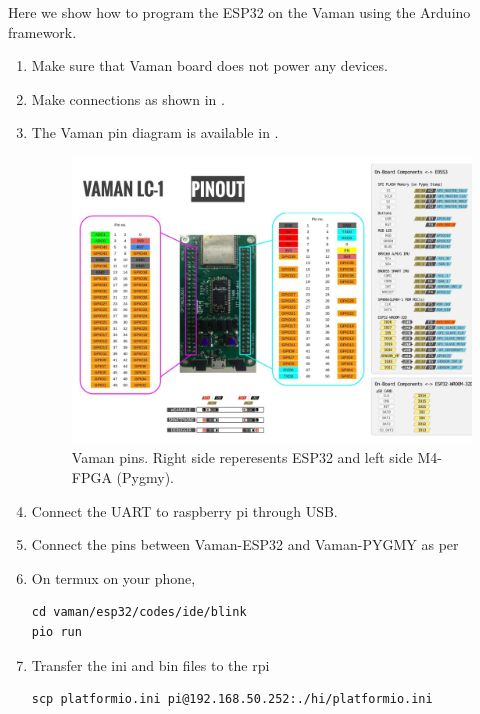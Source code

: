 Here we show how to program the ESP32 on the Vaman using the Arduino framework.
\begin{enumerate}[label=\arabic*.,ref=\theenumi]
\item Make sure that Vaman board does not power any devices.  
\item Make connections as shown in .
\item The Vaman pin diagram is available in .
\begin{figure}
\centering
\includegraphics[width=\columnwidth]{vaman/esp32/vaman-esp32/lcd/figs/pin_sheet.png}
	\caption{Vaman pins.  Right side reperesents ESP32 and left side M4-FPGA (Pygmy).}
\label{fig:vaman-pin_sheet}
\end{figure}
\begin{table}[!ht]
	\centering

\caption{}
\label{tab:arduino-uart}
\end{table}
%
\item Connect the UART to raspberry pi through USB.  
\item Connect the pins between Vaman-ESP32 and Vaman-PYGMY as per 
\begin{table}[h]
\centering

\caption{}
\label{tab:vaman/esp32/setup/onboard}
\end{table}
\item On termux on your phone, 
\begin{lstlisting}
cd vaman/esp32/codes/ide/blink
pio run
\end{lstlisting}
\item Transfer the ini and bin files to the rpi 
\begin{lstlisting}
scp platformio.ini pi@192.168.50.252:./hi/platformio.ini


\end{lstlisting}
\end{enumerate}
